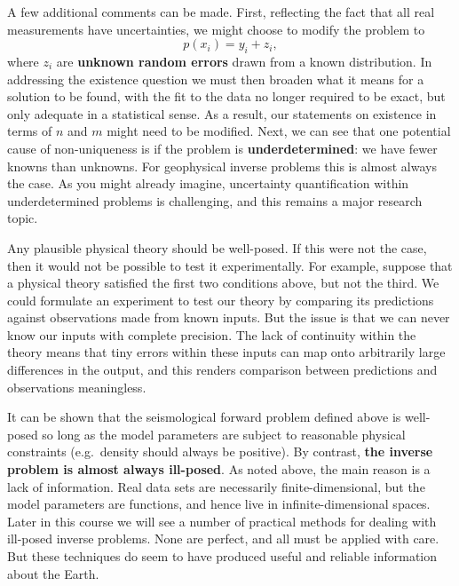 A few additional comments can be made. First, reflecting the fact that all real measurements have uncertainties, we might choose 
to modify the problem to
\begin{equation}\label{eq:28}
p(x_i) = y_i + z_i,
\end{equation}
where $z_i$ are \textbf{unknown random errors} drawn from a known distribution. In addressing the existence question we must then 
broaden what it means for a solution to be found, with the fit to the data no longer required to be exact, but only adequate in a statistical sense.
As a result, our statements on existence in terms of $n$ and $m$ might need to be modified. Next, we can see that one potential 
cause of non-uniqueness is if the problem is \textbf{underdetermined}: we have fewer knowns than unknowns. For 
geophysical inverse problems this is almost always the case. As you might already imagine, uncertainty quantification within 
underdetermined problems is challenging, and this remains a major research topic.

Any plausible physical theory should be well-posed. If this were not the case, then it would not be possible to test it experimentally. 
For example, suppose that a physical theory satisfied the first two conditions above, 
but not the third. We could formulate an experiment to test our theory by comparing its predictions against observations made from 
known inputs. But the issue is that we can never know our inputs with complete precision. 
The lack of continuity within the theory means that tiny errors within these inputs can map onto 
arbitrarily large differences in the output, and this renders comparison between predictions and observations meaningless.

It can be shown that the seismological forward problem defined above is well-posed so long as the model parameters are subject to 
reasonable physical constraints (e.g.\ density should always be positive). By contrast, \textbf{the inverse problem is 
almost always ill-posed}. As noted above, the main reason is a lack of information. Real data sets are necessarily finite-dimensional,
but the model parameters are functions, and hence live in infinite-dimensional spaces. Later in this course 
we will see a number of practical methods for dealing with ill-posed inverse problems. None are perfect, and 
all must be applied with care. But these techniques do seem to have produced useful and reliable information about the Earth.

